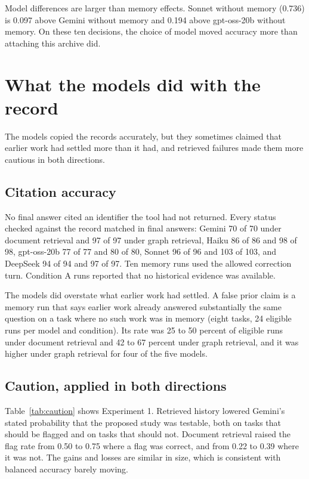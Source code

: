 \documentclass[11pt]{article}
\begin{document}
Model differences are larger than memory effects. Sonnet without memory (0.736) is 0.097 above Gemini without memory and 0.194 above gpt-oss-20b without memory. On these ten decisions, the choice of model moved accuracy more than attaching this archive did.

\section{What the models did with the record}
\label{sec:secondary}

The models copied the records accurately, but they sometimes claimed that earlier work had settled more than it had, and retrieved failures made them more cautious in both directions.

\subsection{Citation accuracy}

No final answer cited an identifier the tool had not returned. Every status checked against the record matched in final answers: Gemini 70 of 70 under document retrieval and 97 of 97 under graph retrieval, Haiku 86 of 86 and 98 of 98, gpt-oss-20b 77 of 77 and 80 of 80, Sonnet 96 of 96 and 103 of 103, and DeepSeek 94 of 94 and 97 of 97. Ten memory runs used the allowed correction turn. Condition A runs reported that no historical evidence was available.

The models did overstate what earlier work had settled. A false prior claim is a memory run that says earlier work already answered substantially the same question on a task where no such work was in memory (eight tasks, 24 eligible runs per model and condition). Its rate was 25 to 50 percent of eligible runs under document retrieval and 42 to 67 percent under graph retrieval, and it was higher under graph retrieval for four of the five models.

\subsection{Caution, applied in both directions}

Table~\ref{tab:caution} shows Experiment 1. Retrieved history lowered Gemini's stated probability that the proposed study was testable, both on tasks that should be flagged and on tasks that should not. Document retrieval raised the flag rate from 0.50 to 0.75 where a flag was correct, and from 0.22 to 0.39 where it was not. The gains and losses are similar in size, which is consistent with balanced accuracy barely moving.
\end{document}
